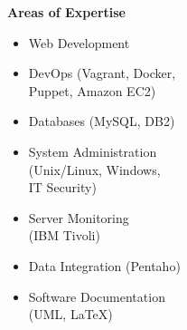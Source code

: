 %
\hfill
%
\begin{minipage}[t]{.35\linewidth}
\vspace{0pt}
\textbf{Areas of Expertise}
\begin{itemize}[itemsep=0pt]
    \item Web Development
    \item DevOps (Vagrant, Docker, \\ Puppet, Amazon EC2)
    \item Databases (MySQL, DB2)
    \item System Administration \\ (Unix/Linux, Windows, \\ IT Security)
    \item Server Monitoring \\ (IBM Tivoli)
    \item Data Integration (Pentaho)
    \item Software Documentation \\ (UML, LaTeX)
\end{itemize}
\end{minipage}